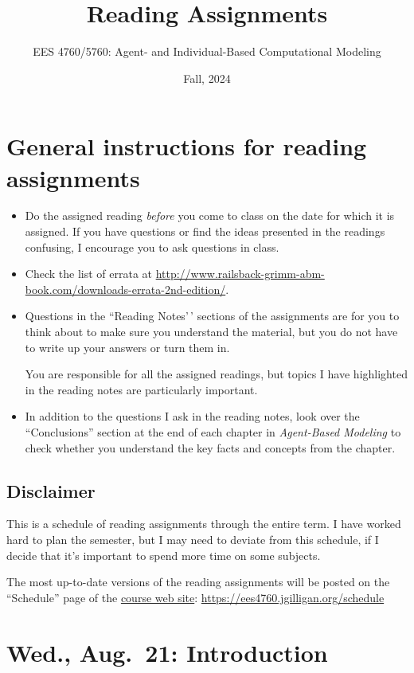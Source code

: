 \documentclass[
]{article}
\title{Reading Assignments}
\author{EES 4760/5760: Agent- and Individual-Based Computational
Modeling}
\date{Fall, 2024}
\begin{document}
\maketitle

\section{General instructions for reading
assignments}\label{general-instructions-for-reading-assignments}

\begin{itemize}
\item
  Do the assigned reading \emph{before\/} you come to class on the date
  for which it is assigned. If you have questions or find the ideas
  presented in the readings confusing, I encourage you to ask questions
  in class.
\item
  Check the list of errata at
  \url{http://www.railsback-grimm-abm-book.com/downloads-errata-2nd-edition/}.
\item
  Questions in the ``Reading Notes'\,' sections of the assignments are
  for you to think about to make sure you understand the material, but
  you do not have to write up your answers or turn them in.

  You are responsible for all the assigned readings, but topics I have
  highlighted in the reading notes are particularly important.
\item
  In addition to the questions I ask in the reading notes, look over the
  ``Conclusions'' section at the end of each chapter in
  \emph{Agent-Based Modeling} to check whether you understand the key
  facts and concepts from the chapter.
\end{itemize}

\subsection{Disclaimer}\label{disclaimer}

This is a schedule of reading assignments through the entire term. I
have worked hard to plan the semester, but I may need to deviate from
this schedule, if I decide that it's important to spend more time on
some subjects.

The most up-to-date versions of the reading assignments will be posted
on the ``Schedule'' page of the
\href{https://ees4760.jgilligan.org/schedule}{course web site}:
\url{https://ees4760.jgilligan.org/schedule}

\section{Wed., Aug.~21: Introduction}\label{wed.-aug.-21-introduction}
\end{document}
